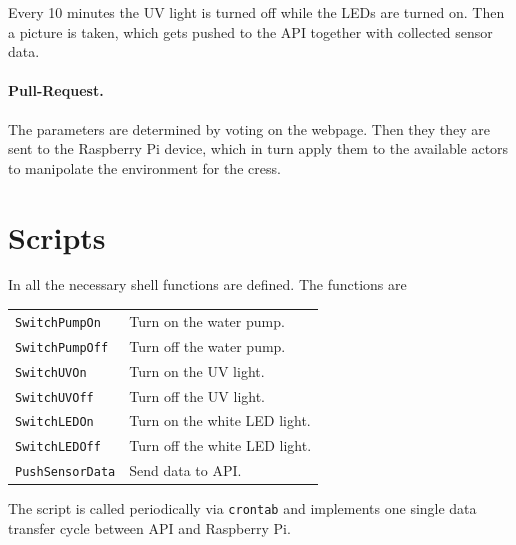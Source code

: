 \documentclass[twocolumn,a4wide,parskip,10pt]{scrartcl}
\begin{document}
Every 10 minutes the UV light is turned off while the LEDs are turned
on. Then a picture is taken, which gets pushed to the API together
with collected sensor data.

\paragraph{Pull-Request.}

The parameters are determined by voting on the webpage. Then they they
are sent to the Raspberry Pi device, which in turn apply them to the
available actors to manipolate the environment for the cress.

\appendix

\section{Scripts}

In  all the necessary shell functions are
defined. The functions are

\begin{tabular}{ll}
  \texttt{SwitchPumpOn} & Turn on the water pump.\\
  \texttt{SwitchPumpOff} & Turn off the water pump.\\
  \texttt{SwitchUVOn} & Turn on the UV light.\\
  \texttt{SwitchUVOff} & Turn off the UV light.\\
  \texttt{SwitchLEDOn} & Turn on the white LED light.\\
  \texttt{SwitchLEDOff} & Turn off the white LED light.\\
  \texttt{PushSensorData} & Send data to API.
\end{tabular}

The script  is called periodically via
\texttt{crontab} and implements one single data transfer cycle between
API and Raspberry Pi.
\end{document}
